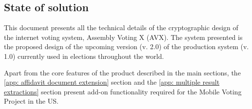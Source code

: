 \subsection{State of solution}
This document presents all the technical details of the cryptographic design of the internet voting system, Assembly Voting X (AVX). The system presented is the proposed design of the upcoming version (v. 2.0) of the production system (v. 1.0) currently used in elections throughout the world.

Apart from the core features of the product described in the main sections, the \cref{app: affidavit document extension} section and the \cref{app: multiple result extractions} section present add-on functionality required for the Mobile Voting Project \cite{Tusk} in the US.
